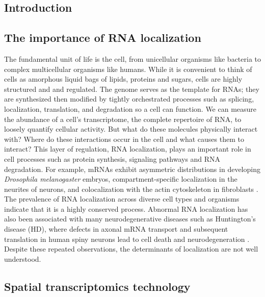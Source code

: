 \begin{dissertationintroduction}
    
\setcounter{chapter}{0}
\chapter*{Introduction}

\label{chap:introduction}

\section{The importance of RNA localization}
The fundamental unit of life is the cell, from unicellular organisms like bacteria to complex multicellular organisms like humans. While it is convenient to think of cells as amorphous liquid bags of lipids, proteins and sugars, cells are highly structured and and regulated. The genome serves as the template for RNAs; they are synthesized then modified by tightly orchestrated processes such as splicing, localization, translation, and degradation so a cell can function. We can measure the abundance of a cell's transcriptome, the complete repertoire of RNA, to loosely quantify cellular activity. But what do these molecules physically interact with? Where do these interactions occur in the cell and what causes them to interact? This layer of regulation, RNA localization, plays an important role in cell processes such as protein synthesis, signaling pathways and RNA degradation. For example, mRNAs exhibit asymmetric distributions in developing \textit{Drosophila melanogaster} embryos, compartment-specific localization in the neurites of neurons, and colocalization with the actin cytoskeleton in fibroblasts \cite{buxbaumRightPlaceRight2015}. The prevalence of RNA localization across diverse cell types and organisms indicate that it is a highly conserved process. Abnormal RNA localization has also been associated with many neurodegenerative diseases such as Huntington's disease (HD), where defects in axonal mRNA transport and subsequent translation in human spiny neurons lead to cell death and neurodegeneration \cite{fernandopulleRNATransportLocal2021}. Despite these repeated observations, the determinants of localization are not well understood.

\section{Spatial transcriptomics technology}


\end{dissertationintroduction}
